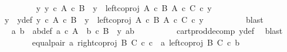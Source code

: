\begin{isabellebody}
\ \ \ \ \ \ \isamarkupfalse%
\ {\isachardoublequoteopen}{\isasymexists}\ y{\isacharprime}{\kern0pt}{\isachardot}{\kern0pt}\ y{\isacharprime}{\kern0pt}\ {\isasymin}\isactrlsub c\ A\ {\isasymtimes}\isactrlsub c\ B\ {\isasymand}\ y\ {\isacharequal}{\kern0pt}\ left{\isacharunderscore}{\kern0pt}coproj\ {\isacharparenleft}{\kern0pt}A\ {\isasymtimes}\isactrlsub c\ B{\isacharparenright}{\kern0pt}\ {\isacharparenleft}{\kern0pt}A\ {\isasymtimes}\isactrlsub c\ C{\isacharparenright}{\kern0pt}\ {\isasymcirc}\isactrlsub c\ y{\isacharprime}{\kern0pt}{\isachardoublequoteclose}\isanewline
\ \ \ \ \ \ \isamarkupfalse%
\ \isamarkupfalse%
\ y{\isacharprime}{\kern0pt}\ \ y{\isacharprime}{\kern0pt}{\isacharunderscore}{\kern0pt}def{\isacharcolon}{\kern0pt}\ {\isachardoublequoteopen}y{\isacharprime}{\kern0pt}\ {\isasymin}\isactrlsub c\ A\ {\isasymtimes}\isactrlsub c\ B\ {\isasymand}\ y\ {\isacharequal}{\kern0pt}\ left{\isacharunderscore}{\kern0pt}coproj\ {\isacharparenleft}{\kern0pt}A\ {\isasymtimes}\isactrlsub c\ B{\isacharparenright}{\kern0pt}\ {\isacharparenleft}{\kern0pt}A\ {\isasymtimes}\isactrlsub c\ C{\isacharparenright}{\kern0pt}\ {\isasymcirc}\isactrlsub c\ y{\isacharprime}{\kern0pt}{\isachardoublequoteclose}\isanewline
\ \ \ \ \ \ \ \ \isamarkupfalse%
\ blast\isanewline
\ \ \ \ \ \ \isamarkupfalse%
\ \isamarkupfalse%
\ a{\isacharprime}{\kern0pt}\ b{\isacharprime}{\kern0pt}\ \ a{\isacharprime}{\kern0pt}b{\isacharprime}{\kern0pt}{\isacharunderscore}{\kern0pt}def{\isacharcolon}{\kern0pt}\ {\isachardoublequoteopen}a{\isacharprime}{\kern0pt}\ {\isasymin}\isactrlsub c\ A\ {\isasymand}\ b{\isacharprime}{\kern0pt}\ {\isasymin}\isactrlsub c\ B\ {\isasymand}\ y{\isacharprime}{\kern0pt}\ {\isacharequal}{\kern0pt}{\isasymlangle}a{\isacharprime}{\kern0pt}{\isacharcomma}{\kern0pt}b{\isacharprime}{\kern0pt}{\isasymrangle}{\isachardoublequoteclose}\isanewline
\ \ \ \ \ \ \ \ \isamarkupfalse%
\ cart{\isacharunderscore}{\kern0pt}prod{\isacharunderscore}{\kern0pt}decomp\ y{\isacharprime}{\kern0pt}{\isacharunderscore}{\kern0pt}def\ \isamarkupfalse%
\ blast\isanewline
\ \ \ \ \ \ \isamarkupfalse%
\ equal{\isacharunderscore}{\kern0pt}pair{\isacharcolon}{\kern0pt}\ {\isachardoublequoteopen}{\isasymlangle}a{\isacharcomma}{\kern0pt}\ right{\isacharunderscore}{\kern0pt}coproj\ B\ C\ {\isasymcirc}\isactrlsub c\ c{\isasymrangle}\ {\isacharequal}{\kern0pt}\ {\isasymlangle}a{\isacharprime}{\kern0pt}{\isacharcomma}{\kern0pt}\ left{\isacharunderscore}{\kern0pt}coproj\ B\ C\ {\isasymcirc}\isactrlsub c\ b{\isacharprime}{\kern0pt}{\isasymrangle}{\isachardoublequoteclose}\isanewline

\end{isabellebody}

